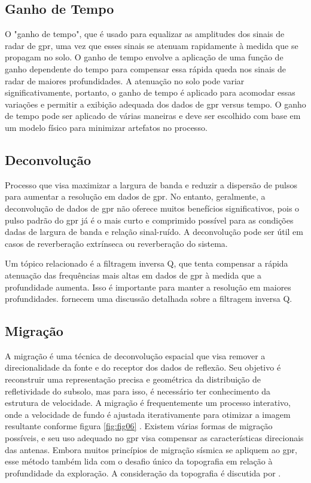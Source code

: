 \subsection{Ganho de Tempo}
\label{subsubsec:ganhodetempo}

O "ganho de tempo", que é usado para equalizar as amplitudes dos sinais de radar de \ac*{gpr}, uma vez que esses sinais se atenuam rapidamente à medida que se propagam no solo. O ganho de tempo envolve a aplicação de uma função de ganho dependente do tempo para compensar essa rápida queda nos sinais de radar de maiores profundidades. A atenuação no solo pode variar significativamente, portanto, o ganho de tempo é aplicado para acomodar essas variações e permitir a exibição adequada dos dados de \ac*{gpr} versus tempo. O ganho de tempo pode ser aplicado de várias maneiras e deve ser escolhido com base em um modelo físico para minimizar artefatos no processo.

\subsection{Deconvolução}
\label{subsubsec:deconvolução}

Processo que visa maximizar a largura de banda e reduzir a dispersão de pulsos para aumentar a resolução em dados de \ac*{gpr}. No entanto, geralmente, a deconvolução de dados de \ac*{gpr} não oferece muitos benefícios significativos, pois o pulso padrão do \ac*{gpr} já é o mais curto e comprimido possível para as condições dadas de largura de banda e relação sinal-ruído. A deconvolução pode ser útil em casos de reverberação extrínseca ou reverberação do sistema.

Um tópico relacionado é a filtragem inversa Q, que tenta compensar a rápida atenuação das frequências mais altas em dados de \ac*{gpr} à medida que a profundidade aumenta. Isso é importante para manter a resolução em maiores profundidades.  fornecem uma discussão detalhada sobre a filtragem inversa Q.

\subsection{Migração}
\label{subsubsec:migração}


A migração é uma técnica de deconvolução espacial que visa remover a direcionalidade da fonte e do receptor dos dados de reflexão. Seu objetivo é reconstruir uma representação precisa e geométrica da distribuição de refletividade do subsolo, mas para isso, é necessário ter conhecimento da estrutura de velocidade. A migração é frequentemente um processo interativo, onde a velocidade de fundo é ajustada iterativamente para otimizar a imagem resultante conforme figura \ref{fig:fig06} . Existem várias formas de migração possíveis, e seu uso adequado no \ac*{gpr} visa compensar as características direcionais das antenas. Embora muitos princípios de migração sísmica se apliquem ao \ac*{gpr}, esse método também lida com o desafio único da topografia em relação à profundidade da exploração. A consideração da topografia é discutida por .

